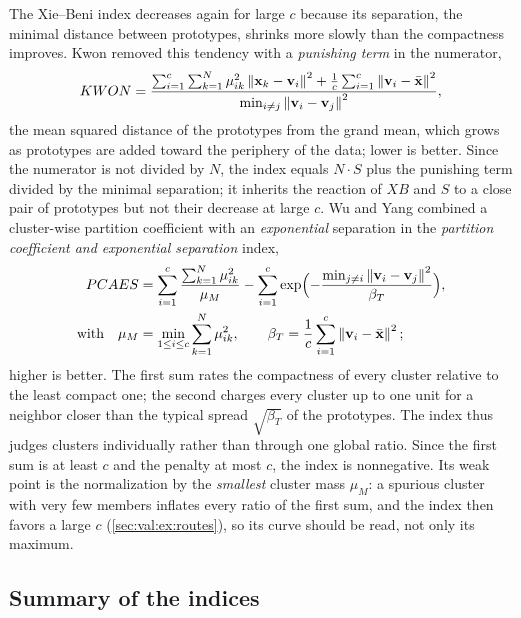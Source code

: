 The Xie--Beni index decreases again for large $c$ because its separation, the minimal distance between prototypes, shrinks more slowly than the compactness improves. Kwon \cite{kwon:1998:validity} removed this tendency with a \emph{punishing term} in the numerator,
\begin{equation}
  KWON=\frac{\sum_{i=1}^{c}\sum_{k=1}^{N}\mu_{ik}^2\left\lVert \mathbf{x}_k-\mathbf{v}_i \right\rVert^2+\frac1c\sum_{i=1}^{c}\left\lVert \mathbf{v}_i-\bar{\mathbf{x}} \right\rVert^2}{\min_{i\ne j}\left\lVert \mathbf{v}_i-\mathbf{v}_j \right\rVert^2},
  \label{eq:val:kwon}
\end{equation}
the mean squared distance of the prototypes from the grand mean, which grows as prototypes are added toward the periphery of the data; lower is better. Since the numerator is not divided by $N$, the index equals $N\cdot S$ plus the punishing term divided by the minimal separation; it inherits the reaction of $XB$ and $S$ to a close pair of prototypes but not their decrease at large $c$. Wu and Yang \cite{wu:2005:pcaes} combined a cluster-wise partition coefficient with an \emph{exponential} separation in the \emph{partition coefficient and exponential separation} index,
\begin{align}
  PCAES&=\sum_{i=1}^{c}\frac{\sum_{k=1}^{N}\mu_{ik}^2}{\mu_M}-\sum_{i=1}^{c}\exp\Bigl(-\frac{\min_{j\ne i}\left\lVert \mathbf{v}_i-\mathbf{v}_j \right\rVert^2}{\beta_T}\Bigr),\label{eq:val:pcaes}\\
  \text{with}\quad \mu_M&=\min_{1\le i\le c}\sum_{k=1}^{N}\mu_{ik}^2,\qquad \beta_T=\frac1c\sum_{i=1}^{c}\left\lVert \mathbf{v}_i-\bar{\mathbf{x}} \right\rVert^2;\notag
\end{align}
higher is better. The first sum rates the compactness of every cluster relative to the least compact one; the second charges every cluster up to one unit for a neighbor closer than the typical spread $\sqrt{\beta_T}$ of the prototypes. The index thus judges clusters individually rather than through one global ratio. Since the first sum is at least $c$ and the penalty at most $c$, the index is nonnegative. Its weak point is the normalization by the \emph{smallest} cluster mass $\mu_M$: a spurious cluster with very few members inflates every ratio of the first sum, and the index then favors a large $c$ (\cref{sec:val:ex:routes}), so its curve should be read, not only its maximum.

\subsection{Summary of the indices}\label{sec:val:table}

